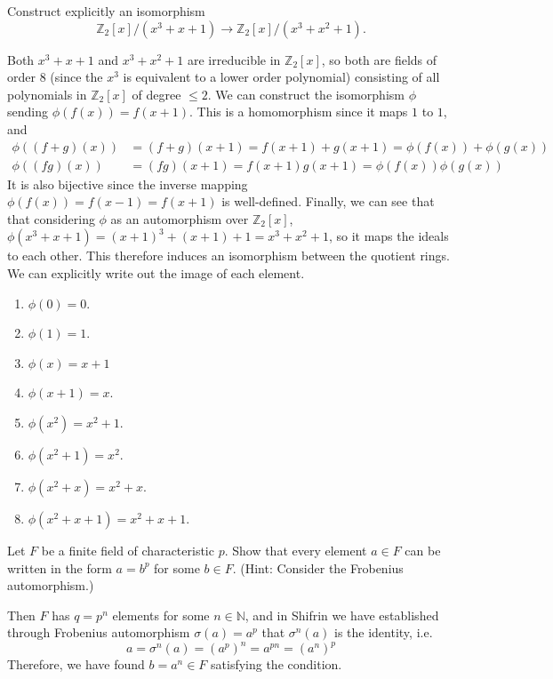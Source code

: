   \begin{exercise}[Shifrin 5.3.4]
    Construct explicitly an isomorphism
    \begin{equation}
      \mathbb{Z}_2[x]/(x^3 + x + 1) \to \mathbb{Z}_2[x]/(x^3 + x^2 + 1).
    \end{equation}
  \end{exercise}
  \begin{solution}
    Both $x^3 + x + 1$ and $x^3 + x^2 + 1$ are irreducible in $\mathbb{Z}_2 [x]$, so both are fields of order $8$ (since the $x^3$ is equivalent to a lower order polynomial) consisting of all polynomials in $\mathbb{Z}_2 [x]$ of degree $\leq 2$. We can construct the isomorphism $\phi$ sending $\phi(f(x)) = f(x+1)$. This is a homomorphism since it maps $1$ to $1$, and 
    \begin{align}
      \phi((f + g)(x)) & = (f + g)(x + 1) = f(x+1) + g(x+1) = \phi(f(x)) + \phi(g(x)) \\
      \phi((fg)(x)) & = (fg)(x + 1) = f(x + 1) g(x + 1) = \phi(f(x)) \phi(g(x))
    \end{align}
    It is also bijective since the inverse mapping $\phi(f(x)) = f(x - 1) = f(x + 1)$ is well-defined. Finally, we can see that that considering $\phi$ as an automorphism over $\mathbb{Z}_2[x]$, $\phi(x^3 + x + 1) = (x + 1)^3 + (x + 1) + 1 = x^3 + x^2 + 1$, so it maps the ideals to each other. This therefore induces an isomorphism between the quotient rings. We can explicitly write out the image of each element. 
    \begin{enumerate}
      \item $\phi(0) = 0$. 
      \item $\phi(1) = 1$. 
      \item $\phi(x) = x + 1$ 
      \item $\phi(x + 1) = x$. 
      \item $\phi(x^2) = x^2 + 1$. 
      \item $\phi(x^2 + 1) = x^2$. 
      \item $\phi(x^2 + x) = x^2 + x$. 
      \item $\phi(x^2 + x + 1) = x^2 + x + 1$. 
    \end{enumerate}
  \end{solution}

  \begin{exercise}[Shifrin 5.3.5]
    Let $F$ be a finite field of characteristic $p$. Show that every element $a \in F$ can be written in the form $a = b^p$ for some $b \in F$. (Hint: Consider the Frobenius automorphism.)
  \end{exercise}
  \begin{solution}
    Then $F$ has $q = p^n$ elements for some $n \in \mathbb{N}$, and in Shifrin we have established through Frobenius automorphism $\sigma(a) = a^p$ that $\sigma^n (a)$ is the identity, i.e. 
    \begin{equation}
      a = \sigma^n (a) = (a^p)^n = a^{pn} = (a^n)^p
    \end{equation}
    Therefore, we have found $b = a^n \in F$ satisfying the condition. 
  \end{solution}

